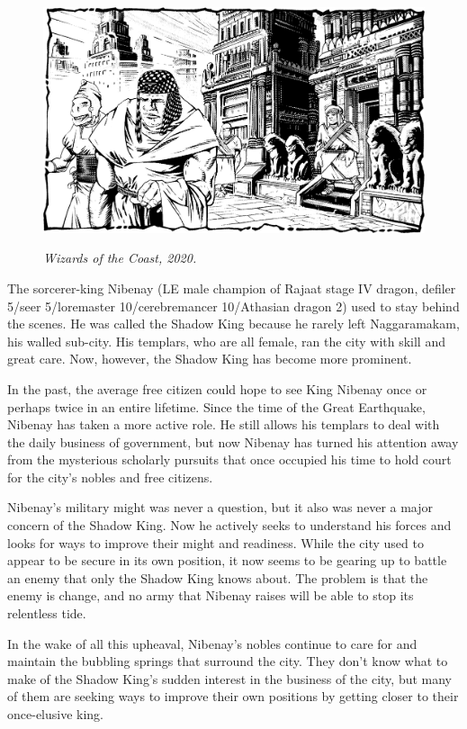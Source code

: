 {
\begin{figure}[b!]
\centering
\includegraphics[width=\textwidth]{images/nibenay-2.png}
\par\textit{\small\textcopyright Wizards of the Coast, 2020.}
\end{figure}

	The sorcerer-king Nibenay (LE male champion of Rajaat stage IV dragon, defiler 5/seer 5/loremaster 10/cerebremancer 10/Athasian dragon 2) used to stay behind the scenes. He was called the Shadow King because he rarely left Naggaramakam, his walled sub-city. His templars, who are all female, ran the city with skill and great care. Now, however, the Shadow King has become more prominent.

	In the past, the average free citizen could hope to see King Nibenay once or perhaps twice in an entire lifetime. Since the time of the Great Earthquake, Nibenay has taken a more active role. He still allows his templars to deal with the daily business of government, but now Nibenay has turned his attention away from the mysterious scholarly pursuits that once occupied his time to hold court for the city's nobles and free citizens.

	Nibenay's military might was never a question, but it also was never a major concern of the Shadow King. Now he actively seeks to understand his forces and looks for ways to improve their might and readiness. While the city used to appear to be secure in its own position, it now seems to be gearing up to battle an enemy that only the Shadow King knows about. The problem is that the enemy is change, and no army that Nibenay raises will be able to stop its relentless tide.

	In the wake of all this upheaval, Nibenay's nobles continue to care for and maintain the bubbling springs that surround the city. They don't know what to make of the Shadow King's sudden interest in the business of the city, but many of them are seeking ways to improve their own positions by getting closer to their once-elusive king.
}
